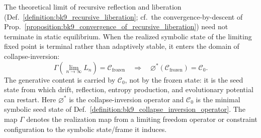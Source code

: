 \begin{corollary}
\label{corollary:bk9_final_collapse_inversion_principle}
The theoretical limit of recursive reflection and liberation (Def.~\ref{definition:bk9_recursive_liberation}; cf.~the convergence-by-descent of Prop.~\ref{proposition:bk9_convergence_of_recursive_liberation}) need not terminate in static equilibrium. When the realized symbolic state of the limiting fixed point is terminal rather than adaptively stable, it enters the domain of collapse-inversion:
\[
\Gamma\!\left(\lim_{n\to\infty}L_n\right)=\mathcal{C}_{\mathrm{frozen}}
\quad\Longrightarrow\quad
\varnothing^*(\mathcal{C}_{\mathrm{frozen}})=\mathcal{C}_0.
\]
The generative content is carried by \(\mathcal{C}_0\), not by the frozen state: it is the seed state from which drift, reflection, entropy production, and evolutionary potential can restart.
Here \(\varnothing^*\) is the collapse-inversion operator and \(\mathcal{C}_0\) is the minimal symbolic seed state of Def.~\ref{definition:bk9_collapse_inversion_operator}. The map \(\Gamma\) denotes the realization map from a limiting freedom operator or constraint configuration to the symbolic state/frame it induces.
\end{corollary}
